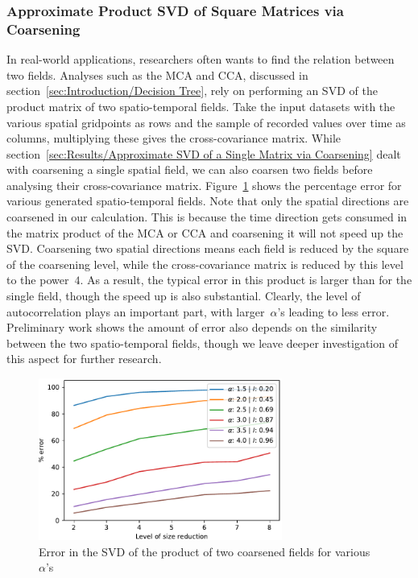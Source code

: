 \documentclass[ijgi,article,submit,moreauthors,pdftex,10pt,a4paper]{Definitions/mdpi}
\begin{document}
\subsubsection{Approximate Product SVD of Square Matrices via Coarsening}
\label{sec:Results/Approximate Product SVD of Square Matrices via Coarsening}

In real-world applications, researchers often wants to find the relation between two fields. Analyses such as the MCA and CCA, discussed in section~\ref{sec:Introduction/Decision Tree}, rely on performing an SVD of the product matrix of two spatio-temporal fields. Take the input datasets with the various spatial gridpoints as rows and the sample of recorded values over time as columns, multiplying these gives the cross-covariance matrix. While section~\ref{sec:Results/Approximate SVD of a Single Matrix via Coarsening} dealt with coarsening a single spatial field, we can also coarsen two fields before analysing their cross-covariance matrix. Figure~\ref{fig:plotProductSpatialTemporalFieldsViaCoarsening} shows the percentage error for various generated spatio-temporal fields. Note that only the spatial directions are coarsened in our calculation. This is because the time direction gets consumed in the matrix product of the MCA or CCA and coarsening it will not speed up the SVD. Coarsening two spatial directions means each field is reduced by the square of the coarsening level, while the cross-covariance matrix is reduced by this level to the power~$4$. As a result, the typical error in this product is larger than for the single field, though the speed up is also substantial. Clearly, the level of autocorrelation plays an important part, with larger~$\alpha$'s leading to less error. Preliminary work shows the amount of error also depends on the similarity between the two spatio-temporal fields, though we leave deeper investigation of this aspect for further research. 

\begin{figure}[H]
\centering
\includegraphics[width=80mm]{Results/plotProductSpatialTemporalFieldsViaCoarsening.pdf}
\caption[Error after coarsening]{Error in the SVD of the product of two coarsened fields for various $\alpha$'s}
\label{fig:plotProductSpatialTemporalFieldsViaCoarsening}
\end{figure}
\end{document}
